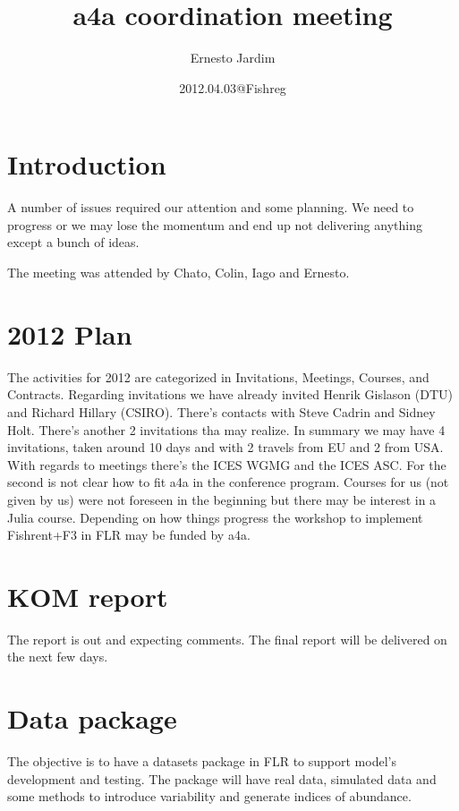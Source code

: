\documentclass[10pt,a4paper]{article}
\begin{document}
\title{a4a coordination meeting}
\date{2012.04.03@Fishreg}
\author{Ernesto Jardim}
\maketitle
\section{Introduction}
A number of issues required our attention and some planning. We need to progress or we may lose the momentum and end up not delivering anything except a bunch of ideas.

The meeting was attended by Chato, Colin, Iago and Ernesto.

\section{2012 Plan}
The activities for 2012 are categorized in Invitations, Meetings, Courses, and Contracts. Regarding invitations we have already invited Henrik Gislason (DTU) and Richard Hillary (CSIRO). There's contacts with Steve Cadrin and Sidney Holt. There's another 2 invitations tha may realize. In summary we may have 4 invitations, taken around 10 days and with 2 travels from EU and 2 from USA. With regards to meetings there's the ICES WGMG and the ICES ASC. For the second is not clear how to fit a4a in the conference program. Courses for us (not given by us) were not foreseen in the beginning but there may be interest in a Julia course. Depending on how things progress the workshop to implement Fishrent+F3 in FLR may be funded by a4a. 

\section{KOM report}
The report is out and expecting comments. The final report will be delivered on the next few days.

\section{Data package}
The objective is to have a datasets package in FLR to support model's development and testing. The package will have real data, simulated data and some methods to introduce variability and generate indices of abundance.
\end{document}

